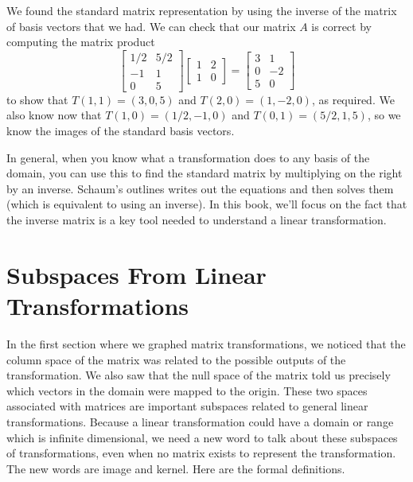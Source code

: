 \begin{example}
We found the standard matrix representation by using the inverse of the matrix of basis vectors that we had. We can check that our matrix $A$ is correct by computing the matrix product 
$$\begin{bmatrix}1/2&5/2\\-1&1\\0&5\end{bmatrix}
\begin{bmatrix}1&2\\1&0\end{bmatrix} 
= \begin{bmatrix}3&1\\0&-2\\5&0\end{bmatrix}$$ to show that $T(1,1)=(3,0,5)$ and $T(2,0)=(1,-2,0)$, as required.  We also know now that $T(1,0) = (1/2,-1,0)$ and $T(0,1)=(5/2,1,5)$, so we know the images of the standard basis vectors. 
\end{example}
 
In general, when you know what a transformation does to any basis of the domain, you can use this to find the standard matrix by multiplying on the right by an inverse.  
Schaum's outlines writes out the equations and then solves them (which is equivalent to using an inverse). In this book, we'll focus on the fact that the inverse matrix is a key tool needed to understand a linear transformation.




  
\section{Subspaces From Linear Transformations}

In the first section where we graphed matrix transformations, we noticed that the column space of the matrix was related to the possible outputs of the transformation. We also saw that the null space of the matrix told us precisely which vectors in the domain were mapped to the origin.  These two spaces associated with matrices are important subspaces related to general linear transformations.  Because a linear transformation could have a domain or range which is infinite dimensional, we need a new word to talk about these subspaces of transformations, even when no matrix exists to represent the transformation.  The new words are image and kernel. Here are the formal definitions.


